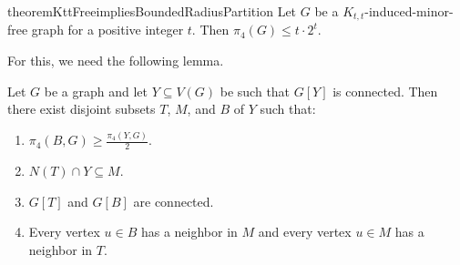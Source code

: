 \begin{restatable}{theorem}{KttFreeimpliesBoundedRadiusPartition}\label{thm:ktt_free_implies_bounded_radius_partition}
   Let $G$ be a $K_{t,t}$-induced-minor-free graph for a positive integer $t$. Then $\pi_4(G) \leq t \cdot 2^t$.
\end{restatable}

For this, we need the following lemma.

\begin{lemma}\label{lem:obtain_new_layer}
    Let $G$ be a graph and let $Y \subseteq V(G)$ be such that $G[Y]$ is connected. Then there exist disjoint subsets $T$, $M$, and $B$ of $Y$ such that:
    \begin{enumerate}
        \item $\pi_4(B,G) \geq \frac{\pi_4(Y,G)}{2}$.
        \item $N(T) \cap Y \subseteq M$.
        \item $G[T]$ and $G[B]$ are connected.
        \item Every vertex $u \in B$ has a neighbor in $M$ and every vertex $u \in M$ has a neighbor in $T$.
    \end{enumerate}
\end{lemma}

